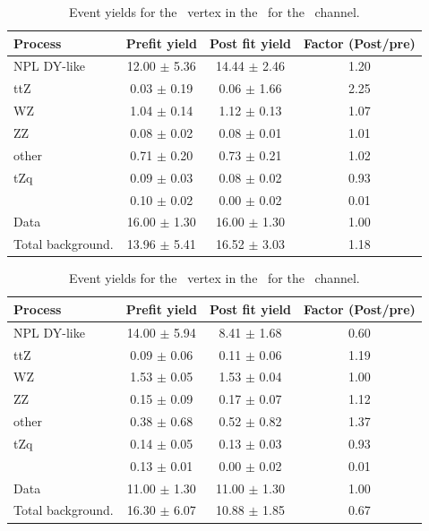 \begin{table}[htbp]
	\centering
	\caption{Event yields for the \Zct\ vertex in the \STCR\  for the \emumu\ channel. }
	\begin{tabular} {l c c c }
		\toprule
		Process & Prefit yield & Post fit yield & Factor (Post/pre) \\
		\midrule
		NPL DY-like & 12.00 $ \pm $ 5.36 & 14.44 $ \pm $ 2.46 & 1.20 \\ 
		ttZ & 0.03 $ \pm $ 0.19 & 0.06 $ \pm $ 1.66 & 2.25 \\ 
		WZ & 1.04 $ \pm $ 0.14 & 1.12 $ \pm $ 0.13 & 1.07 \\ 
		ZZ & 0.08 $ \pm $ 0.02 & 0.08 $ \pm $ 0.01 & 1.01 \\ 
		other & 0.71 $ \pm $ 0.20 & 0.73 $ \pm $ 0.21 & 1.02 \\ 
		tZq & 0.09 $ \pm $ 0.03 & 0.08 $ \pm $ 0.02 & 0.93 \\ 
		\kZct  & 0.10 $ \pm $ 0.02 & 0.00 $ \pm $ 0.02 & 0.01\\
		\hdashline
		Data & 16.00 $ \pm $ 1.30 & 16.00 $ \pm $ 1.30 & 1.00\\
		Total background. & 13.96 $ \pm $ 5.41 & 16.52 $ \pm $ 3.03 & 1.18\\
		\bottomrule
	\end{tabular}
\end{table}
\begin{table}[htbp]
	\centering
	\caption{Event yields for the \Zct\ vertex in the \STCR\  for the \mumumu\ channel. }
	\begin{tabular} {l c c c }
		\toprule
		Process & Prefit yield & Post fit yield & Factor (Post/pre) \\
		\midrule
		NPL DY-like & 14.00 $ \pm $ 5.94 & 8.41 $ \pm $ 1.68 & 0.60 \\ 
		ttZ & 0.09 $ \pm $ 0.06 & 0.11 $ \pm $ 0.06 & 1.19 \\ 
		WZ & 1.53 $ \pm $ 0.05 & 1.53 $ \pm $ 0.04 & 1.00 \\ 
		ZZ & 0.15 $ \pm $ 0.09 & 0.17 $ \pm $ 0.07 & 1.12 \\ 
		other & 0.38 $ \pm $ 0.68 & 0.52 $ \pm $ 0.82 & 1.37 \\ 
		tZq & 0.14 $ \pm $ 0.05 & 0.13 $ \pm $ 0.03 & 0.93 \\ 
		\kZct  & 0.13 $ \pm $ 0.01 & 0.00 $ \pm $ 0.02 & 0.01\\
		\hdashline
		Data & 11.00 $ \pm $ 1.30 & 11.00 $ \pm $ 1.30 & 1.00\\
		Total background. & 16.30 $ \pm $ 6.07 & 10.88 $ \pm $ 1.85 & 0.67\\
		\bottomrule
	\end{tabular}
\end{table}
